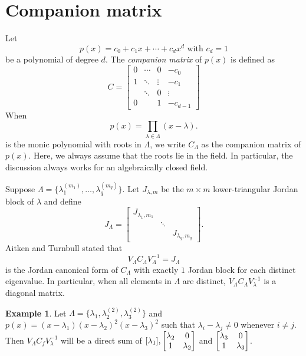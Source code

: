 \documentclass{article}
\theoremstyle{definition}
\newtheorem{example}[theorem]{Example}
\begin{document}
\section{Companion matrix}

Let 
\[
    p(x) = c_0 + c_1x + \cdots + c_{d}x^{d} \text{ with } c_d = 1
\]
be a polynomial of degree $d$.  The \emph{companion matrix} of $p(x)$ is defined as 
\[
    C = \begin{bmatrix}
        0 & \cdots & 0 & -c_0 \\
        1 & \ddots & \vdots & -c_{1} \\
        ~ & \ddots & 0 & \vdots \\
        0 & ~ & 1 & -c_{d-1}
    \end{bmatrix}
\]
When 
\[
    p(x) = \prod_{\lambda\in\Lambda}(x - \lambda).
\]
is the monic polynomial with roots in $\Lambda$, we write $C_\Lambda$ as the companion matrix of $p(x)$.
Here, we always assume that the roots lie in the field. In particular, the discussion always works for
an algebraically closed field.

Suppose $\Lambda = \{\lambda_1^{(m_1)}, \ldots, \lambda_q^{(m_q)}\}$.  
Let $J_{\lambda,m}$ be the $m\times m$ lower-triangular Jordan block of $\lambda$ and define 
\[
    J_\Lambda = \begin{bmatrix}
        J_{\lambda_1,m_1} & ~ & ~ \\
        ~ & \ddots & ~ \\
        ~ & ~ & J_{\lambda_q,m_q}
    \end{bmatrix}.
\]
Aitken and Turnbull \cite{AT32} stated that 
\[
    V_\Lambda C_\Lambda V_\Lambda^{-1} = J_\Lambda
\]
is the Jordan canonical form of $C_\Lambda$ with exactly $1$ Jordan block for each distinct eigenvalue.  
In particular, when all elements in $\Lambda$ are distinct, $V_\Lambda C_\Lambda V_\lambda^{-1}$ is a diagonal matrix.  

\begin{example} Let $\Lambda = \{\lambda_1, \lambda_2^{(2)}, \lambda_3^{(2)}\}$ and $p(x) = (x-\lambda_1)(x-\lambda_2)^2(x-\lambda_3)^2$
such that $\lambda_i-\lambda_j \ne 0$ whenever $i\ne j$.
Then $V_\Lambda C_f V_\lambda^{-1}$ will be a direct sum of $[\lambda_1], \begin{bmatrix} \lambda_2 & 0 \cr 
1 & \lambda_2\end{bmatrix}$ and $
 \begin{bmatrix} \lambda_3 & 0 \cr 
1 & \lambda_3\end{bmatrix}$.
\end{example}
\end{document}

